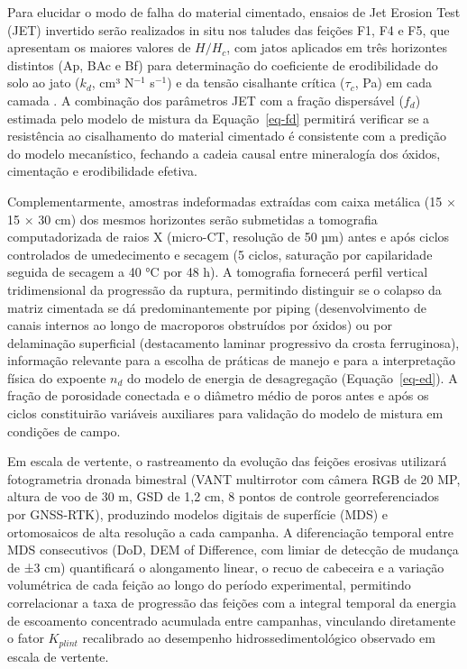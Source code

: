 \documentclass[
  brazilian,
  authoryear,
  preprint]{elsarticle}
\begin{document}
Para elucidar o modo de falha do material cimentado, ensaios de Jet
Erosion Test (JET) invertido serão realizados in situ nos taludes das
feições F1, F4 e F5, que apresentam os maiores valores de \(H/H_c\), com
jatos aplicados em três horizontes distintos (Ap, BAc e Bf) para
determinação do coeficiente de erodibilidade do solo ao jato (\(k_d\),
cm³ N\(^{-1}\) s\(^{-1}\)) e da tensão cisalhante crítica (\(\tau_c\),
Pa) em cada camada \citep{hanson_cook_2004}. A combinação dos parâmetros
JET com a fração dispersável (\(f_d\)) estimada pelo modelo de mistura
da Equação~\ref{eq-fd} permitirá verificar se a resistência ao
cisalhamento do material cimentado é consistente com a predição do
modelo mecanístico, fechando a cadeia causal entre mineralogía dos
óxidos, cimentação e erodibilidade efetiva.

Complementarmente, amostras indeformadas extraídas com caixa metálica
(15 × 15 × 30 cm) dos mesmos horizontes serão submetidas a tomografia
computadorizada de raios X (micro-CT, resolução de 50 µm) antes e após
ciclos controlados de umedecimento e secagem (5 ciclos, saturação por
capilaridade seguida de secagem a 40 °C por 48 h). A tomografia
fornecerá perfil vertical tridimensional da progressão da ruptura,
permitindo distinguir se o colapso da matriz cimentada se dá
predominantemente por piping (desenvolvimento de canais internos ao
longo de macroporos obstruídos por óxidos) ou por delaminação
superficial (destacamento laminar progressivo da crosta ferruginosa),
informação relevante para a escolha de práticas de manejo e para a
interpretação física do expoente \(n_d\) do modelo de energia de
desagregação (Equação~\ref{eq-ed}). A fração de porosidade conectada e o
diâmetro médio de poros antes e após os ciclos constituirão variáveis
auxiliares para validação do modelo de mistura em condições de campo.

Em escala de vertente, o rastreamento da evolução das feições erosivas
utilizará fotogrametria dronada bimestral (VANT multirrotor com câmera
RGB de 20 MP, altura de voo de 30 m, GSD de 1,2 cm, 8 pontos de controle
georreferenciados por GNSS-RTK), produzindo modelos digitais de
superfície (MDS) e ortomosaicos de alta resolução a cada campanha. A
diferenciação temporal entre MDS consecutivos (DoD, DEM of Difference,
com limiar de detecção de mudança de ±3 cm) quantificará o alongamento
linear, o recuo de cabeceira e a variação volumétrica de cada feição ao
longo do período experimental, permitindo correlacionar a taxa de
progressão das feições com a integral temporal da energia de escoamento
concentrado acumulada entre campanhas, vinculando diretamente o fator
\(K_{plint}\) recalibrado ao desempenho hidrossedimentológico observado
em escala de vertente.
\end{document}

